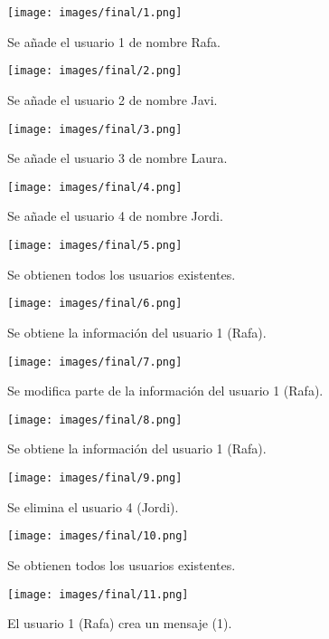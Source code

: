 \documentclass[12pt,a4paper, spanish]{article}
\begin{document}
\begin{figure}[H]
	\centering
	\texttt{[image: images/final/1.png]}
	\caption{Se añade el usuario 1 de nombre Rafa.}
\end{figure}
\begin{figure}[H]
	\centering
	\texttt{[image: images/final/2.png]}
	\caption{Se añade el usuario 2 de nombre Javi.}
\end{figure}
\begin{figure}[H]
	\centering
	\texttt{[image: images/final/3.png]}
	\caption{Se añade el usuario 3 de nombre Laura.}
\end{figure}
\begin{figure}[H]
	\centering
	\texttt{[image: images/final/4.png]}
	\caption{Se añade el usuario 4 de nombre Jordi.}
\end{figure}
\begin{figure}[H]
	\centering
	\texttt{[image: images/final/5.png]}
	\caption{Se obtienen todos los usuarios existentes.}
\end{figure}
\begin{figure}[H]
	\centering
	\texttt{[image: images/final/6.png]}
	\caption{Se obtiene la información del usuario 1 (Rafa).}
\end{figure}
\begin{figure}[H]
	\centering
	\texttt{[image: images/final/7.png]}
	\caption{Se modifica parte de la información del usuario 1 (Rafa).}
\end{figure}
\begin{figure}[H]
	\centering
	\texttt{[image: images/final/8.png]}
	\caption{Se obtiene la información del usuario 1 (Rafa).}
\end{figure}
\begin{figure}[H]
	\centering
	\texttt{[image: images/final/9.png]}
	\caption{Se elimina el usuario 4 (Jordi).}
\end{figure}
\begin{figure}[H]
	\centering
	\texttt{[image: images/final/10.png]}
	\caption{Se obtienen todos los usuarios existentes.}
\end{figure}
\begin{figure}[H]
	\centering
	\texttt{[image: images/final/11.png]}
	\caption{El usuario 1 (Rafa) crea un mensaje (1).}
\end{figure}
\end{document}
